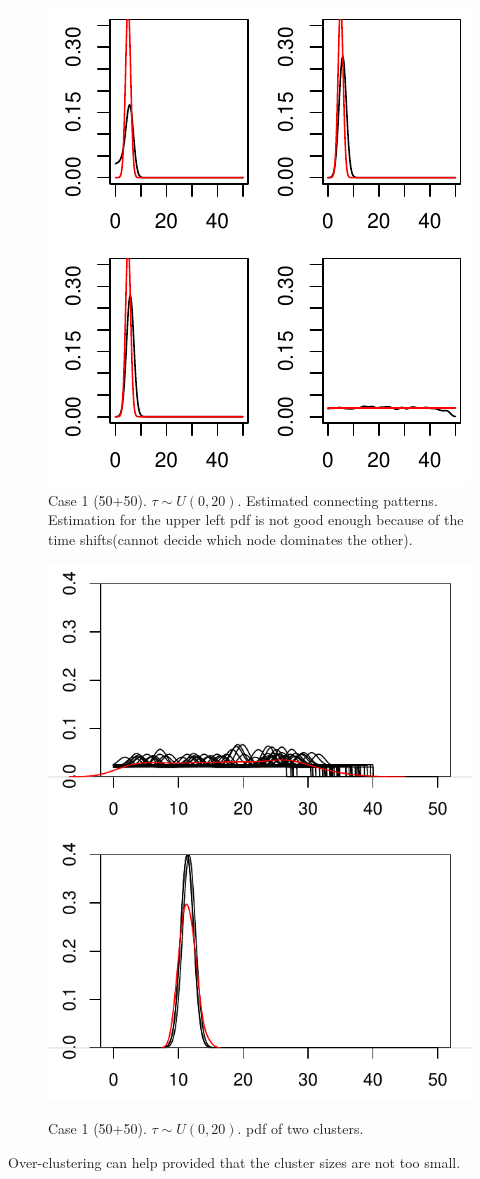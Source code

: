 \begin{figure}[H]
\includegraphics[width=.6\textwidth]{../simulation/plots/case1_conn_patt_mat}
\caption{Case 1 (50+50). $\tau\sim U(0,20)$. Estimated connecting patterns. Estimation for the upper left pdf is not good enough because of the time shifts(cannot decide which node dominates the other).}
\end{figure}


\begin{figure}[H]
\includegraphics[width=.49\textwidth]{../simulation/plots/case1_clus1}
\includegraphics[width=.49\textwidth]{../simulation/plots/case1_clus2}
\caption{Case 1 (50+50). $\tau\sim U(0,20)$. pdf of two clusters.}
\end{figure}


Over-clustering can help provided that the cluster sizes are not too small.

